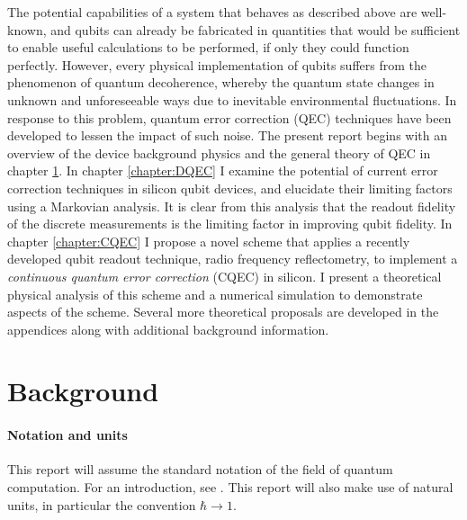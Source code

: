 \documentclass{report}
\begin{document}
The potential capabilities of a system that behaves as described above are well-known, and qubits can already be fabricated in quantities that would be sufficient to enable useful calculations to be performed, if only they could function perfectly. However, every physical implementation of qubits suffers from the phenomenon of quantum decoherence, whereby the quantum state changes in unknown and unforeseeable ways due to inevitable environmental fluctuations. In response to this problem, quantum error correction (QEC) techniques have been developed to lessen the impact of such noise. The present report begins with an overview of the device background physics and the general theory of QEC in chapter \ref{chapter:background}. In chapter \ref{chapter:DQEC} I examine the potential of current error correction techniques in silicon qubit devices, and elucidate their limiting factors using a Markovian analysis. It is clear from this analysis that the readout fidelity of the discrete measurements is the limiting factor in improving qubit fidelity. In chapter \ref{chapter:CQEC} I propose a novel scheme that applies a recently developed qubit readout technique, radio frequency reflectometry, to implement a \textit{continuous quantum error correction} (CQEC) in silicon. I present a theoretical physical analysis of this scheme and a numerical simulation to demonstrate aspects of the scheme. Several more theoretical proposals are developed in the appendices along with additional background information.

\chapter{Background}\label{chapter:background}
\subsubsection{Notation and units}
This report will assume the standard notation of the field of quantum computation. For an introduction, see \cite{Nielsen2010}. This report will also make use of natural units, in particular the convention $\hbar \rightarrow 1$.
\end{document}
